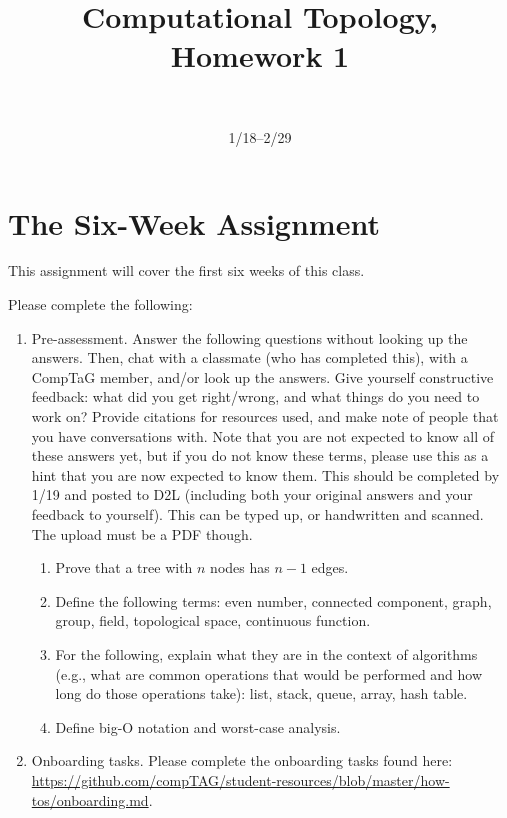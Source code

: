 \documentclass{article}
\title{Computational Topology, Homework 1}
\author{~}
\date{1/18--2/29}
\begin{document}
\maketitle

\section*{The Six-Week Assignment}

This assignment will cover the first six weeks of this class.

Please complete the following:
\begin{enumerate}
    \item Pre-assessment. Answer the following questions without looking up the
        answers.  Then, chat with a classmate (who has completed this), with a
        CompTaG member, and/or
        look up the answers. Give yourself constructive feedback: what did you
        get right/wrong, and what things do you need to work on? Provide
        citations for resources used, and make note of people that you have
        conversations with. Note that you are not expected to know all of these
        answers yet, but if you do not know these terms, please use this as a
        hint that you are now expected to know them.
        This should be completed by 1/19 and posted to D2L (including both your
        original answers and your feedback to yourself).  This can be typed
        up, or handwritten and scanned.  The upload must be a PDF though.
        \begin{enumerate}
            \item Prove that a tree with $n$ nodes has $n-1$ edges.
            \item Define the following terms: even number, connected component,
                graph, group, field, topological space, continuous function.
            \item For the following, explain what they are in the context of
                algorithms (e.g., what are common operations that would be
                performed and how long do those operations take): list, stack, queue,
                array, hash table.
            \item Define big-O notation and worst-case analysis.
        \end{enumerate}
    \item Onboarding tasks.  Please complete the onboarding tasks found here:
        \url{https://github.com/compTAG/student-resources/blob/master/how-tos/onboarding.md}.

\end{enumerate}
\end{document}
